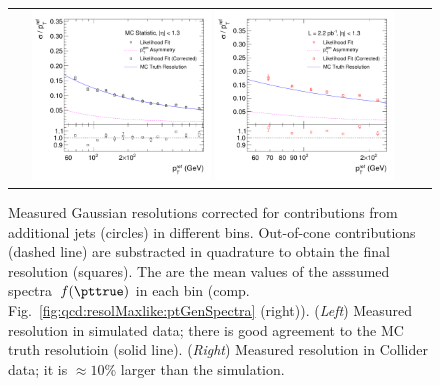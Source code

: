 \begin{figure}[ht]
  \label{fig:ResFit:ResoGauss}
  \centering
  \begin{tabular}{cc}
    \includegraphics[width=0.45\textwidth]{figures/MaxLike_Eta00-13_ExtraResoBottomRatio}
    \includegraphics[width=0.45\textwidth]{figures/MaxLike_Data132440-144011_Eta00-13_ExtraResoBottomRatio}\\
  \end{tabular}
  \caption{Measured Gaussian resolutions corrected for
    contributions from additional jets (circles) in different \pt bins.
    Out-of-cone contributions (dashed line) are substracted in
    quadrature to obtain the final resolution (squares).
    The \ptref are the mean values of the asssumed spectra~$f(\pttrue)$
    in each bin (comp. Fig.~\ref{fig:qcd:resolMaxlike:ptGenSpectra}
    (right)).
    (\textit{Left}) Measured resolution in simulated data; there is good
    agreement to the MC truth resolutioin (solid line).
    (\textit{Right}) Measured resolution in Collider data; it is
    $\approx10\%$ larger than the simulation.
  }
\end{figure}
